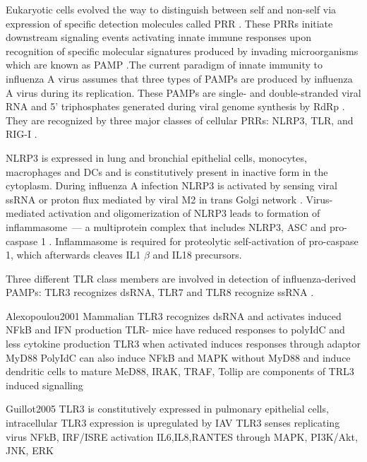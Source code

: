 		Eukaryotic cells evolved the way to distinguish between self and non-self via expression of specific detection molecules called \gls{PRR} \parencite{Janeway2002}. These \gls{PRR}s initiate downstream signaling events activating innate immune responses upon recognition of specific molecular signatures produced by invading microorganisms which are known as \gls{PAMP} \parencite{Janeway1989}.The current paradigm of innate immunity to influenza A virus assumes that three types of \gls{PAMP}s are produced by influenza A virus during its replication. These \gls{PAMP}s are single- and double-stranded viral RNA and 5' triphosphates generated during viral genome synthesis by \gls{RdRp} \parencite{Guillot2005, Hornung2006, Kato2006, Lund2004}. They are recognized by three major classes of cellular \gls{PRR}s: \gls{NLRP3}, \gls{TLR}, and \gls{RIG-I} \parencite{Iwasaki2014}.
		
		\gls{NLRP3} is expressed in lung and bronchial epithelial cells, monocytes, macrophages and \gls{DC}s \parencite{Guarda2011, Kim2014} and is constitutively present in inactive form in the cytoplasm. During influenza A infection \gls{NLRP3} is activated by sensing viral \gls{ssRNA} or proton flux mediated by viral \gls{M2} in trans Golgi network \parencite{Thomas2009, Ichinohe2010, Allen2009}. Virus-mediated activation and oligomerization of \gls{NLRP3} leads to formation of inflammasome~--- a multiprotein complex that includes \gls{NLRP3}, \gls{ASC} and pro-caspase 1 \parencite{Tschopp2010}. Inflammasome is required for proteolytic self-activation of pro-caspase 1, which afterwards cleaves IL1 $\beta$ and IL18 precursors.
		
		Three different \gls{TLR} class members are involved in detection of influenza-derived \gls{PAMP}s: \gls{TLR}3 recognizes dsRNA, \gls{TLR}7 and \gls{TLR}8 recognize ssRNA \parencite{Iwasaki2014}. 
		
		Alexopoulou2001
		Mammalian TLR3 recognizes dsRNA and activates induced NFkB and IFN production
		TLR-\- mice have reduced responses to polyIdC and less cytokine production
		TLR3 when activated induces responses through adaptor MyD88
		PolyIdC can also induce NFkB and MAPK without MyD88 and induce dendritic cells to mature
		MeD88, IRAK, TRAF, Tollip are components of TRL3 induced signalling
		
		Guillot2005
		TLR3 is constitutively expressed  in pulmonary epithelial cells, intracellular
		TLR3 expression is upregulated by IAV
		TLR3 senses replicating virus
		NFkB, IRF/ISRE activation
		IL6,IL8,RANTES through MAPK, PI3K/Akt, JNK, ERK
		
